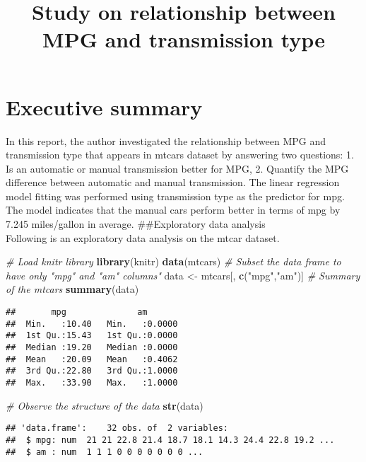 \documentclass[]{article}
\title{Study on relationship between MPG and transmission type}
\author{}
\date{}
\newenvironment{Shaded}{\begin{snugshade}}{\end{snugshade}}
\newcommand{\KeywordTok}[1]{\textcolor[rgb]{0.13,0.29,0.53}{\textbf{#1}}}
\newcommand{\StringTok}[1]{\textcolor[rgb]{0.31,0.60,0.02}{#1}}
\newcommand{\CommentTok}[1]{\textcolor[rgb]{0.56,0.35,0.01}{\textit{#1}}}
\newcommand{\NormalTok}[1]{#1}
\begin{document}
\maketitle

\section{Executive summary}\label{executive-summary}

In this report, the author investigated the relationship between MPG and
transmission type that appears in mtcars dataset by answering two
questions: 1. Is an automatic or manual transmission better for MPG, 2.
Quantify the MPG difference between automatic and manual transmission.
The linear regression model fitting was performed using transmission
type as the predictor for mpg. The model indicates that the manual cars
perform better in terms of mpg by 7.245 miles/gallon in average.
\#\#Exploratory data analysis\\
Following is an exploratory data analysis on the mtcar dataset.

\begin{Shaded}
\begin{Highlighting}[]
\CommentTok{# Load knitr library}
\KeywordTok{library}\NormalTok{(knitr)}
\KeywordTok{data}\NormalTok{(mtcars)}
\CommentTok{# Subset the data frame to have only "mpg" and "am" columns"}
\NormalTok{data <-}\StringTok{ }\NormalTok{mtcars[, }\KeywordTok{c}\NormalTok{(}\StringTok{"mpg"}\NormalTok{,}\StringTok{"am"}\NormalTok{)]}
\CommentTok{# Summary of the mtcars}
\KeywordTok{summary}\NormalTok{(data)}
\end{Highlighting}
\end{Shaded}

\begin{verbatim}
##       mpg              am        
##  Min.   :10.40   Min.   :0.0000  
##  1st Qu.:15.43   1st Qu.:0.0000  
##  Median :19.20   Median :0.0000  
##  Mean   :20.09   Mean   :0.4062  
##  3rd Qu.:22.80   3rd Qu.:1.0000  
##  Max.   :33.90   Max.   :1.0000
\end{verbatim}

\begin{Shaded}
\begin{Highlighting}[]
\CommentTok{# Observe the structure of the data}
\KeywordTok{str}\NormalTok{(data)}
\end{Highlighting}
\end{Shaded}

\begin{verbatim}
## 'data.frame':    32 obs. of  2 variables:
##  $ mpg: num  21 21 22.8 21.4 18.7 18.1 14.3 24.4 22.8 19.2 ...
##  $ am : num  1 1 1 0 0 0 0 0 0 0 ...
\end{verbatim}
\end{document}
